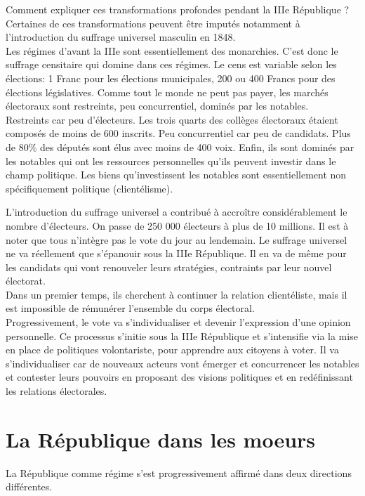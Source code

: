 \documentclass[10pt, a4paper, openany]{book}
\begin{document}
Comment expliquer ces transformations profondes pendant la IIIe République ? \\
Certaines de ces transformations peuvent être imputés notamment à l'introduction du suffrage universel masculin en 1848. \\
Les régimes d'avant la IIIe sont essentiellement des monarchies. C'est donc le suffrage censitaire qui domine dans ces régimes. Le cens est variable selon les élections: 1 Franc pour les élections municipales, 200 ou 400 Francs pour des élections législatives. Comme tout le monde ne peut pas payer, les marchés électoraux sont restreints, peu concurrentiel, dominés par les notables. \\
Restreints car peu d'électeurs. Les trois quarts des collèges électoraux étaient composés de moins de 600 inscrits. Peu concurrentiel car peu de candidats. Plus de 80\% des députés sont élus avec moins de 400 voix. Enfin, ils sont dominés par les notables qui ont les ressources personnelles qu'ils peuvent investir dans le champ politique. Les biens qu'investissent les notables sont essentiellement non spécifiquement politique (clientélisme).


L'introduction du suffrage universel a contribué à accroître considérablement le nombre d'électeurs. On passe de 250 000 électeurs à plus de 10 millions. Il est à noter que tous n'intègre pas le vote du jour au lendemain. Le suffrage universel ne va réellement que s'épanouir sous la IIIe République. Il en va de même pour les candidats qui vont renouveler leurs stratégies, contraints par leur nouvel électorat. \\
Dans un premier temps, ils cherchent à continuer la relation clientéliste, mais il est impossible de rémunérer l'ensemble du corps électoral. \\
Progressivement, le vote va s'individualiser et devenir l'expression d'une opinion personnelle. Ce processus s'initie sous la IIIe République et s'intensifie via la mise en place de politiques volontariste, pour apprendre aux citoyens à voter. Il va s'individualiser car de nouveaux acteurs vont émerger et concurrencer les notables et contester leurs pouvoirs en proposant des visions politiques et en redéfinissant les relations électorales.

\section{La République dans les moeurs}

La République comme régime s'est progressivement affirmé dans deux directions différentes.
\end{document}
